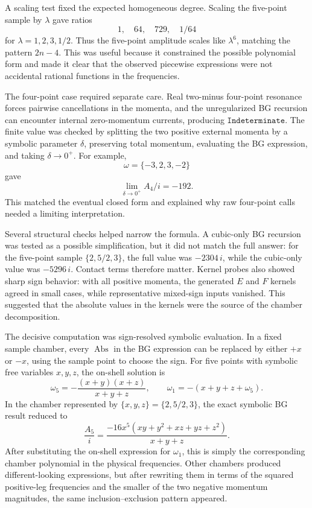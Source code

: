 \documentclass[11pt]{article}
\begin{document}
A scaling test fixed the expected homogeneous degree. Scaling the five-point
sample by \(\lambda\) gave ratios
\[
    1,\quad 64,\quad 729,\quad 1/64
\]
for \(\lambda=1,2,3,1/2\). Thus the five-point amplitude scales like
\(\lambda^6\), matching the pattern \(2n-4\). This was useful because it
constrained the possible polynomial form and made it clear that the observed
piecewise expressions were not accidental rational functions in the
frequencies.

The four-point case required separate care. Real two-minus four-point
resonance forces pairwise cancellations in the momenta, and the unregularized
BG recursion can encounter internal zero-momentum currents, producing
\(\texttt{Indeterminate}\). The finite value was checked by splitting the two
positive external momenta by a symbolic parameter \(\delta\), preserving total
momentum, evaluating the BG expression, and taking \(\delta\to0^+\). For
example,
\[
    \omega=\{-3,2,3,-2\}
\]
gave
\[
    \lim_{\delta\to0^+} A_4/i=-192.
\]
This matched the eventual closed form and explained why raw four-point calls
needed a limiting interpretation.

Several structural checks helped narrow the formula. A cubic-only BG recursion
was tested as a possible simplification, but it did not match the full answer:
for the five-point sample \(\{2,5/2,3\}\), the full value was
\(-2304\,i\), while the cubic-only value was \(-5296\,i\). Contact terms
therefore matter. Kernel probes also showed sharp sign behavior: with all
positive momenta, the generated \(E\) and \(F\) kernels agreed in small cases,
while representative mixed-sign inputs vanished. This suggested that the
absolute values in the kernels were the source of the chamber decomposition.

The decisive computation was sign-resolved symbolic evaluation. In a fixed
sample chamber, every \(\operatorname{Abs}\) in the BG expression can be
replaced by either \(+x\) or \(-x\), using the sample point to choose the sign.
For five points with symbolic free variables \(x,y,z\), the on-shell solution is
\[
    \omega_5=-\frac{(x+y)(x+z)}{x+y+z},
    \qquad
    \omega_1=-(x+y+z+\omega_5).
\]
In the chamber represented by \(\{x,y,z\}=\{2,5/2,3\}\), the exact symbolic
BG result reduced to
\[
    \frac{A_5}{i}
    =
    \frac{-16x^5(xy+y^2+xz+yz+z^2)}{x+y+z}.
\]
After substituting the on-shell expression for \(\omega_1\), this is simply the
corresponding chamber polynomial in the physical frequencies. Other chambers
produced different-looking expressions, but after rewriting them in terms of
the squared positive-leg frequencies and the smaller of the two negative
momentum magnitudes, the same inclusion--exclusion pattern appeared.
\end{document}
